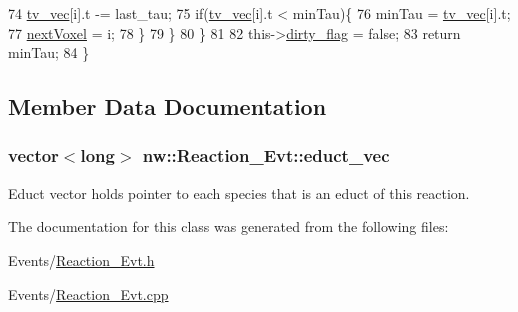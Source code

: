 \begin{DoxyCode}
74             \hyperlink{classnw_1_1___event_a6351b58d94923ed58e0b2cf6c9445d2e}{tv\_vec}[i].t -= last\_tau;
75             \textcolor{keywordflow}{if}(\hyperlink{classnw_1_1___event_a6351b58d94923ed58e0b2cf6c9445d2e}{tv\_vec}[i].t < minTau)\{
76                 minTau = \hyperlink{classnw_1_1___event_a6351b58d94923ed58e0b2cf6c9445d2e}{tv\_vec}[i].t;
77                 \hyperlink{classnw_1_1___event_a7864559e204c087306e3becb5b81fb26}{nextVoxel} = i;
78             \}
79         \}
80     \}
81 
82     this->\hyperlink{classnw_1_1___event_aaa705b35c06c0cb2e0a4f3daa9ee8037}{dirty\_flag} = \textcolor{keyword}{false};
83     \textcolor{keywordflow}{return} minTau;
84 \}
\end{DoxyCode}


\subsection{Member Data Documentation}
\hypertarget{classnw_1_1_reaction___evt_ae20c8b7d42ef1607200e1e2541db9a70}{
\subsubsection[{educt\+\_\+vec}]{\setlength{\rightskip}{0pt plus 5cm}vector$<$long$>$ nw\+::\+Reaction\+\_\+\+Evt\+::educt\+\_\+vec\hspace{0.3cm}{\ttfamily [protected]}}}\label{classnw_1_1_reaction___evt_ae20c8b7d42ef1607200e1e2541db9a70}


Educt vector holds pointer to each species that is an educt of this reaction. 



The documentation for this class was generated from the following files\+:\begin{DoxyCompactItemize}
\item 
Events/\hyperlink{_reaction___evt_8h}{Reaction\+\_\+\+Evt.\+h}\item 
Events/\hyperlink{_reaction___evt_8cpp}{Reaction\+\_\+\+Evt.\+cpp}\end{DoxyCompactItemize}
